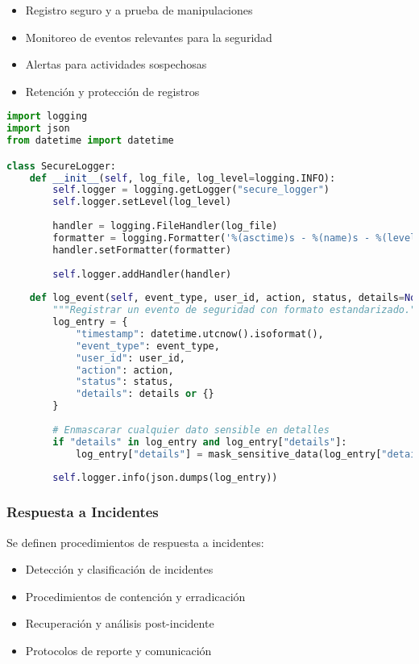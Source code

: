 \begin{itemize}
    \item Registro seguro y a prueba de manipulaciones
    \item Monitoreo de eventos relevantes para la seguridad
    \item Alertas para actividades sospechosas
    \item Retención y protección de registros
\end{itemize}

\begin{lstlisting}[language=python, caption=Ejemplo de Registro Seguro]
import logging
import json
from datetime import datetime

class SecureLogger:
    def __init__(self, log_file, log_level=logging.INFO):
        self.logger = logging.getLogger("secure_logger")
        self.logger.setLevel(log_level)
        
        handler = logging.FileHandler(log_file)
        formatter = logging.Formatter('%(asctime)s - %(name)s - %(levelname)s - %(message)s')
        handler.setFormatter(formatter)
        
        self.logger.addHandler(handler)
        
    def log_event(self, event_type, user_id, action, status, details=None):
        """Registrar un evento de seguridad con formato estandarizado."""
        log_entry = {
            "timestamp": datetime.utcnow().isoformat(),
            "event_type": event_type,
            "user_id": user_id,
            "action": action,
            "status": status,
            "details": details or {}
        }
        
        # Enmascarar cualquier dato sensible en detalles
        if "details" in log_entry and log_entry["details"]:
            log_entry["details"] = mask_sensitive_data(log_entry["details"])
            
        self.logger.info(json.dumps(log_entry))
\end{lstlisting}

\subsubsection{Respuesta a Incidentes}
Se definen procedimientos de respuesta a incidentes:

\begin{itemize}
    \item Detección y clasificación de incidentes
    \item Procedimientos de contención y erradicación
    \item Recuperación y análisis post-incidente
    \item Protocolos de reporte y comunicación
\end{itemize}

